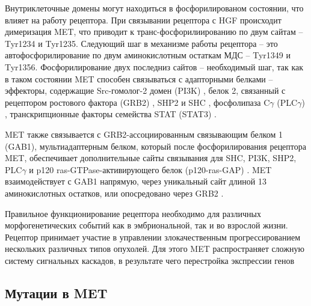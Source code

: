 Внутриклеточные домены могут находиться в фосфорилированом состоянии, что влияет на работу рецептора. При связывании рецептора с HGF происходит димеризация MET, что приводит к транс-фосфорилиированию по двум сайтам -- Tyr1234 и Tyr1235. Следующий шаг в механизме работы рецептора -- это автофосфорилирование по двум аминокислотным остаткам МДС -- Tyr1349 и Tyr1356. Фосфорилирование двух последниз сайтов -- необходимый шаг, так как в таком состоянии MET способен связываться с адапторными белками -- эффекторы, содержащие Src-гомолог-2 домен (PI3K) \cite{ponzetto_multifunctional_1994}, белок 2, связанный с рецептором ростового фактора (GRB2) \cite{ponzetto_multifunctional_1994}, SHP2 \cite{fixman_pathways_1996} и SHC \cite{fixman_pathways_1996}, фосфолипаза C$\gamma$ (PLC$\gamma$) \cite{ponzetto_multifunctional_1994}, транскрипционные факторы семейства STAT (STAT3) \cite{zhang_requirement_2002}. 

MET также связывается с GRB2-ассоциированным связывающим белком 1 (GAB1), мультиадаптерным белком, который после фосфорилирования рецептора MET, обеспечивает дополнительные сайты связывания для SHC, PI3K, SHP2, PLC$\gamma$ и p120 ras-GTPase-активирующего белок (p120-ras-GAP) \cite{trusolino_met_2010}. MET взаимодействует с GAB1 напрямую, через уникальный сайт длиной 13 аминокислотных остатков, или опосредовано через GRB2 \cite{schaeper_coupling_2000} \cite{lock_identification_2000}.

Правильное функционирование рецептора необходимо для различных морфогенетических событий как в эмбриональной, так и во взрослой жизни. Рецептор принимает участие в управлении злокачественным прогрессированием нескольких различных типов опухолей. Для этого MET распространяет сложную систему сигнальных каскадов, в результате чего
перестройка экспрессии генов

\subsection{Мутации в MET}


